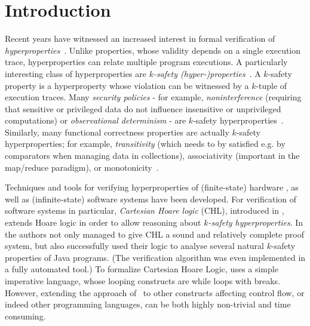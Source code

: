 \section{Introduction}
Recent years have witnessed an increased interest in formal verification of
\emph{hyperproperties}~\cite{ClarksonS08}. Unlike properties, whose validity depends on a single
execution trace, hyperproperties can relate multiple program executions. A
particularly interesting class of hyperproperties are \emph{$k$-safety
  (hyper-)properties}~\cite{FinkbeinerHT19CanonicalKsafety,SousaD16,AgrawalB16RuntimeKSafetyHLTL,ClarksonS08}.
A $k$-safety property is a hyperproperty whose violation can be witnessed by a
$k$-tuple of execution traces.  Many \emph{security policies} - for example,
\emph{noninterference} (requiring that sensitive or privileged data do not influence
insensitive or unprivileged computations)
or
\emph{observational determinism} 
- are $k$-safety hyperproperties~\cite{ClarksonFKMRS14,ClarksonFKMRS14TR,ClarksonS08}.
Similarly, many functional correctness properties are actually $k$-safety
hyperproperties; for example, \emph{transitivity} (which needs to by satisfied
e.g. by comparators when managing data in collections), associativity
(important in the map/reduce paradigm), or monotonicity~\cite{SousaD16}.


Techniques and tools for verifying hyperproperties of (finite-state) hardware
\cite{CoenenFST19,FinkbeinerRS15}, as well as (infinite-state) software
systems have been developed.  For verification of software systems in
particular, \emph{Cartesian Hoare logic} (CHL), introduced in \cite{SousaD16},
extends Hoare logic in order to allow reasoning about \emph{$k$-safety
  hyperproperties}. In \cite{SousaD16} the authors not only managed to give
CHL a sound and relatively complete proof system, but also successfully used
their logic to analyse several natural $k$-safety properties of Java
programs. (The verification algorithm was even implemented in a fully automated
tool.) To formalize Cartesian Hoare Logic, \cite{SousaD16} uses a simple
imperative language, whose looping constructs are while loops with
breaks. However, extending the approach of~\cite{SousaD16} to
other constructs affecting control flow, or indeed other programming
languages, can be both highly non-trivial and time consuming.


